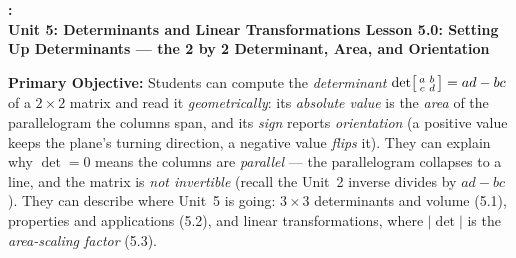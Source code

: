 \documentclass[10pt]{article}
\newcommand{\UnitNumberName}{Unit 5: Determinants and Linear Transformations \quad}
\newcommand{\LessonNumberName}{Lesson 5.0: Setting Up Determinants --- the 2 by 2 Determinant, Area, and Orientation}
\begin{document}
\begin{center}
    {\Large\bfseries \CourseName: \SchoolYear \\
    {\small\bfseries \UnitNumberName \LessonNumberName}}
\end{center}

\begin{tcolorbox}[colback=blush, colframe=burgundy, boxrule=0.9pt, arc=2mm,
    left=2mm, right=2mm, top=1.5mm, bottom=1.5mm]
    \textbf{Primary Objective:} Students can compute the \emph{determinant}
    $\det\begin{bsmallmatrix} a & b\\ c & d \end{bsmallmatrix}=ad-bc$ of a $2\times2$ matrix and
    read it \emph{geometrically}: its \emph{absolute value} is the \emph{area} of the parallelogram
    the columns span, and its \emph{sign} reports \emph{orientation} (a positive value keeps the
    plane's turning direction, a negative value \emph{flips} it). They can explain why
    $\det=0$ means the columns are \emph{parallel} --- the parallelogram collapses to a line, and the
    matrix is \emph{not invertible} (recall the Unit~2 inverse divides by $ad-bc$). They can describe
    where Unit~5 is going: $3\times3$ determinants and volume (5.1), properties and applications
    (5.2), and linear transformations, where $|\det|$ is the \emph{area-scaling factor} (5.3).
\end{tcolorbox}
\end{document}

